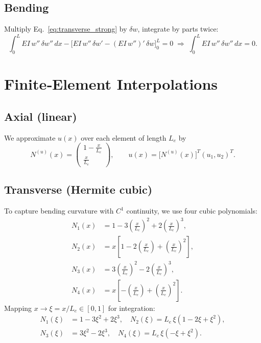 \documentclass{article}
\begin{document}
	\subsection{Bending}
	Multiply Eq.~\eqref{eq:transverse_strong} by \(\delta w\), integrate by parts twice:
	\begin{equation}\label{eq:bending_weak}
		\int_0^L EI\,w''\,\delta w''\,dx 
		- \bigl[EI\,w''\,\delta w' - (EI\,w'')'\,\delta w\bigr]_0^L = 0
		\;\Longrightarrow\;
		\int_0^L EI\,w''\,\delta w''\,dx = 0.
	\end{equation}
	
	\section{Finite‐Element Interpolations}
	\subsection{Axial (linear)}
	We approximate \(u(x)\) over each element of length \(L_e\) by
	\begin{equation}\label{eq:axial_interp}
		N^{(u)}(x)
		= \begin{pmatrix}1-\tfrac{x}{L_e}\\[4pt]\tfrac{x}{L_e}\end{pmatrix},
		\qquad
		u(x)=\bigl[N^{(u)}(x)\bigr]^T(u_1,u_2)^T.
	\end{equation}
	
	\subsection{Transverse (Hermite cubic)}
	To capture bending curvature with \(C^1\) continuity, we use four cubic polynomials:
	\begin{equation}\label{eq:cubic_interp}
		\begin{aligned}
			N_1(x)&=1-3(\tfrac{x}{L_e})^2+2(\tfrac{x}{L_e})^3,\\
			N_2(x)&=x[1-2(\tfrac{x}{L_e})+(\tfrac{x}{L_e})^2],\\
			N_3(x)&=3(\tfrac{x}{L_e})^2-2(\tfrac{x}{L_e})^3,\\
			N_4(x)&=x[-(\tfrac{x}{L_e})+(\tfrac{x}{L_e})^2].
		\end{aligned}
	\end{equation}
	Mapping \(x\to\xi=x/L_e\in[0,1]\) for integration:
	\begin{equation}\label{eq:map_interp}
		\begin{aligned}
			N_1(\xi)&=1-3\xi^2+2\xi^3,\quad
			N_2(\xi)=L_e\,\xi(1-2\xi+\xi^2),\\
			N_3(\xi)&=3\xi^2-2\xi^3,\quad
			N_4(\xi)=L_e\,\xi(-\xi+\xi^2).
		\end{aligned}
	\end{equation}
	
\end{document}
